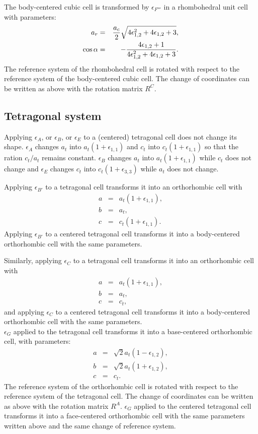 \documentclass[12pt,a4paper,twoside]{report}
\begin{document}
The body-centered cubic cell is transformed by 
$\epsilon_{F'''}$ in a rhombohedral unit cell
with parameters:
\begin{eqnarray}
a_r&=& {a_c \over 2} \sqrt{ 4\epsilon_{1,2}^2 + 4\epsilon_{1,2} + 3 }, \\
\cos\alpha &=& -{4\epsilon_{1,2}+1 \over 4\epsilon_{1,2}^2+4\epsilon_{1,2}+3}.
\end{eqnarray}
The reference system of the rhombohedral cell is rotated with respect to
the reference system of the body-centered cubic cell. 
The change of coordinates can be written as above with the rotation matrix 
$R^C$.

{\color{web-blue}\subsection{Tetragonal system}}
\color{black}

Applying $\epsilon_A$, or $\epsilon_B$, or $\epsilon_E$ to a 
(centered) tetragonal cell
does not change its shape. $\epsilon_A$ changes $a_t$ into 
$a_t(1+\epsilon_{1,1})$ and $c_t$ into $c_t(1+\epsilon_{1,1})$ so that the
ration $c_t/a_t$ remains constant. 
$\epsilon_B$ changes $a_t$ into $a_t(1+\epsilon_{1,1})$
while $c_t$ does not change and $\epsilon_E$ changes  
$c_t$ into $c_t(1+\epsilon_{3,3})$ while $a_t$ does not change.

Applying $\epsilon_{B'}$ to a tetragonal cell transforms it into an  
orthorhombic cell with
\begin{eqnarray}
a&=& a_t (1+\epsilon_{1,1}), \\
b&=& a_t, \\
c&=& c_t (1+\epsilon_{1,1}).
\end{eqnarray}
Applying $\epsilon_{B'}$ to a centered tetragonal cell transforms it
into a body-centered orthorhombic cell with the same
parameters. 

Similarly, applying $\epsilon_C$ to a tetragonal cell transforms 
it into an  orthorhombic cell with
\begin{eqnarray}
a&=&a_t (1+\epsilon_{1,1}), \\
b&=&a_t, \\
c&=&c_t,
\end{eqnarray}
and applying $\epsilon_C$ to a centered tetragonal cell transforms it
into a body-centered orthorhombic cell with the same
parameters.\\

$\epsilon_G$ applied to the tetragonal cell transforms it into a 
base-centered orthorhombic cell, with parameters:
\begin{eqnarray}
a&=&\sqrt{2} a_t (1-\epsilon_{1,2}), \\
b&=&\sqrt{2} a_t (1+\epsilon_{1,2}) , \\
c&=&c_t.
\end{eqnarray}
The reference system of the orthorhombic cell is rotated with respect to
the reference system of the tetragonal cell. 
The change of coordinates can be written as above with the rotation matrix 
$R^A$.
$\epsilon_G$ applied to the centered tetragonal cell transforms it into
a face-centered orthorhombic cell with the same parameters written above
and the same change of reference system.
\end{document}
